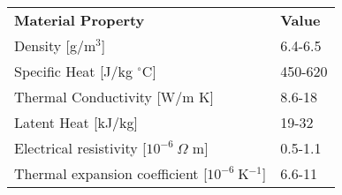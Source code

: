 \documentclass[border=1mm,
               class=article
               preview]{standalone}
\begin{document}
\renewcommand{\arraystretch}{1.5}
 {
\begin{tabular}{ll}
   \rowcolor{black} \textbf{\color{white} Material Property} & \textbf{\color{white} Value}\\
   Density [g/m$^3$] & 6.4-6.5\\
   Specific Heat [J/kg $^\circ$C] & 450-620\\
   Thermal Conductivity [W/m K] & 8.6-18\\
   Latent Heat [kJ/kg] & 19-32\\
   Electrical resistivity [$10^{-6}~\Omega$ m] & 0.5-1.1\\
   Thermal expansion coefficient [$10^{-6}~$K$^{-1}$] & 6.6-11\\
\end{tabular}}
\renewcommand{\arraystretch}{1}
\end{document}
